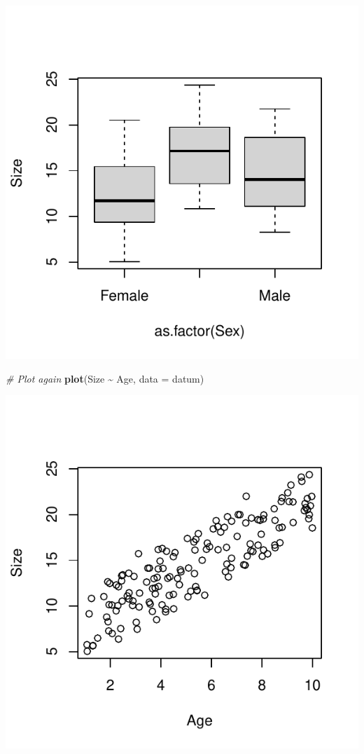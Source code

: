 \documentclass[
]{article}
\newenvironment{Shaded}{\begin{snugshade}}{\end{snugshade}}
\newcommand{\AttributeTok}[1]{\textcolor[rgb]{0.13,0.29,0.53}{#1}}
\newcommand{\CommentTok}[1]{\textcolor[rgb]{0.56,0.35,0.01}{\textit{#1}}}
\newcommand{\FunctionTok}[1]{\textcolor[rgb]{0.13,0.29,0.53}{\textbf{#1}}}
\newcommand{\NormalTok}[1]{#1}
\newcommand{\SpecialCharTok}[1]{\textcolor[rgb]{0.81,0.36,0.00}{\textbf{#1}}}
\begin{document}
\includegraphics{lecture_12_files/figure-latex/analysis_2_2-1.pdf}

\begin{Shaded}
\begin{Highlighting}[]
\CommentTok{\# Plot again}
\FunctionTok{plot}\NormalTok{(Size }\SpecialCharTok{\textasciitilde{}}\NormalTok{ Age, }\AttributeTok{data =}\NormalTok{ datum)}
\end{Highlighting}
\end{Shaded}

\includegraphics{lecture_12_files/figure-latex/analysis_2_2-2.pdf}
\end{document}
